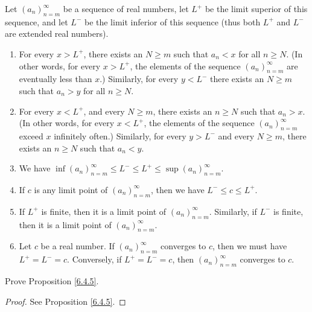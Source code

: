 \begin{proposition}\label{6.4.12}
Let \((a_n)_{n = m}^\infty\) be a sequence of real numbers, let \(L^+\) be the limit superior of this sequence, and let \(L^-\) be the limit inferior of this sequence
(thus both \(L^+\) and \(L^-\) are extended real numbers).
\begin{enumerate}
    \item For every \(x > L^+\), there exists an \(N \geq m\) such that \(a_n < x\) for all \(n \geq N\).
    (In other words, for every \(x > L^+\), the elements of the sequence \((a_n)_{n = m}^\infty\) are eventually less than \(x\).)
    Similarly, for every \(y < L^-\) there exists an \(N \geq m\) such that \(a_n > y\) for all \(n \geq N\).
    \item For every \(x < L^+\), and every \(N \geq m\), there exists an \(n \geq N\) such that \(a_n > x\).
    (In other words, for every \(x < L^+\), the elements of the sequence \((a_n)_{n = m}^\infty\) exceed \(x\) infinitely often.)
    Similarly, for every \(y > L^-\) and every \(N \geq m\), there exists an \(n \geq N\) such that \(a_n < y\).
    \item We have \(\inf(a_n)_{n = m}^\infty \leq L^- \leq L^+ \leq \sup(a_n)_{n = m}^\infty\).
    \item If \(c\) is any limit point of \((a_n)_{n = m}^\infty\), then we have \(L^- \leq c \leq L^+\).
    \item If \(L^+\) is finite, then it is a limit point of \((a_n)_{n = m}^\infty\).
    Similarly, if \(L^-\) is finite, then it is a limit point of \((a_n)_{n = m}^\infty\).
    \item Let \(c\) be a real number.
    If \((a_n)_{n = m}^\infty\) converges to \(c\), then we must have \(L^+ = L^- = c\).
    Conversely, if \(L^+ = L^- = c\), then \((a_n)_{n = m}^\infty\) converges to \(c\).
\end{enumerate}
\end{proposition}

\exercisesection

\begin{exercise}\label{ex 6.4.1}
Prove Proposition \ref{6.4.5}.
\end{exercise}

\begin{proof}
See Proposition \ref{6.4.5}.
\end{proof}
